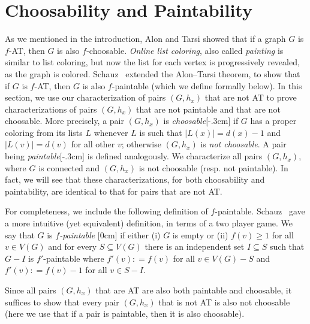 \documentclass[12pt]{article}
\theoremstyle{plain}
\theoremstyle{definition}
\theoremstyle{remark}
\newcommand{\DefinedAs}{\mathrel{\mathop:}=}
\newcommand{\aside}[1]{\marginnote{\scriptsize{#1}}[0cm]}
\newcommand{\aaside}[2]{\marginnote{\scriptsize{#1}}[#2]}
\begin{document}
	\section{Choosability and Paintability}
	\label{extensions}
	As we mentioned in the introduction, Alon and Tarsi showed that if a graph $G$
	is $f$-AT, then $G$ is also $f$-choosable.  \emph{Online list coloring}, also
	called \emph{painting} is similar to list coloring, but now the list for each
	vertex is progressively revealed, as the graph is colored. 
	Schauz~\cite{schauz2010flexible} extended the Alon--Tarsi theorem, to show that
	if $G$ is $f$-AT, then $G$ is also $f$-paintable (which we define formally
	below).  In this section, we use our
	characterization of pairs $(G,h_x)$ that are not AT to prove characterizations
	of pairs $(G,h_x)$ that are not paintable and that are not choosable.  More
	precisely, a pair $(G,h_x)$ is \emph{choosable}\aaside{choosable pair}{-.3cm}
	if $G$ has a proper coloring from its lists $L$ whenever $L$ is such that
	$|L(x)|=d(x)-1$ and $|L(v)|=d(v)$ for all other $v$; otherwise $(G,h_x)$ is
	\emph{not choosable}.  A pair being \emph{paintable}\aaside{paintable
		pair}{-.3cm} is defined analogously.  We characterize all pairs $(G,h_x)$,
	where $G$ is connected and $(G,h_x)$ is not choosable (resp. not paintable).  
	In fact, we will see that these characterizations, for both choosability and
	paintability, are identical to that for pairs that are not AT.  
	
	For completeness, we include the following definition of $f$-paintable.
	Schauz~\cite{schauz2009mr} gave a more intuitive (yet equivalent) definition,
	in terms of a two player game.  We say that $G$ is \emph{$f$-paintable}
	\aside{$f$-paintable} if either (i) $G$ is empty or (ii) $f(v) \ge 1$ for all
	$v \in V(G)$ and for every $S \subseteq V(G)$ there is an independent set $I
	\subseteq S$ such that $G-I$ is $f'$-paintable where $f'(v) \DefinedAs f(v)$
	for all $v \in V(G) - S$ and $f'(v) \DefinedAs f(v) - 1$ for all $v \in S - I$.
	
	Since all pairs $(G,h_x)$ that are AT are also both paintable and choosable, it
	suffices to show that every pair $(G,h_x)$ that is not AT is also not choosable
	(here we use that if a pair is paintable, then it is also choosable).
	
\end{document}

